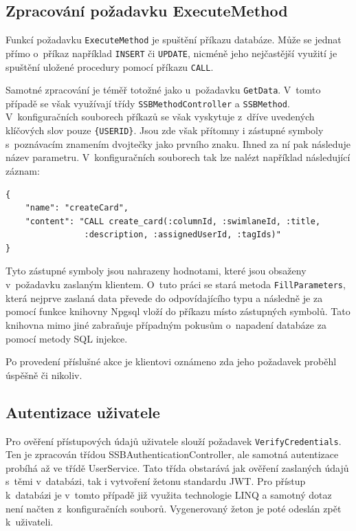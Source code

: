 \subsection{Zpracování požadavku ExecuteMethod}
Funkcí požadavku \texttt{ExecuteMethod} je spuštění příkazu databáze. Může se jednat přímo o~příkaz například \texttt{INSERT} či \texttt{UPDATE}, nicméně jeho nejčastější využití je spuštění uložené procedury pomocí příkazu \texttt{CALL}.

Samotné zpracování je téměř totožné jako u~požadavku \texttt{GetData}. V~tomto případě se však využívají třídy \texttt{SSBMethodController} a \texttt{SSBMethod}. V~konfiguračních souborech příkazů se však vyskytuje z~dříve uvedených klíčových slov pouze \texttt{\{USERID\}}. Jsou zde však přítomny i zástupné symboly s~poznávacím znamením dvojtečky jako prvního znaku. Ihned za ní pak následuje název parametru. V~konfiguračních souborech tak lze nalézt například následující záznam:

\begin{verbatim}
{
    "name": "createCard",
    "content": "CALL create_card(:columnId, :swimlaneId, :title,
                :description, :assignedUserId, :tagIds)"
}
\end{verbatim}

Tyto zástupné symboly jsou nahrazeny hodnotami, které jsou obsaženy v~požadavku zaslaným klientem. O~tuto práci se stará metoda \texttt{FillParameters}, která nejprve zaslaná data převede do odpovídajícího typu a následně je za pomocí funkce knihovny Npgsql vloží do příkazu místo zástupných symbolů. Tato knihovna mimo jiné zabraňuje případným pokusům o~napadení databáze za pomocí metody SQL injekce. 

Po provedení příslušné akce je klientovi oznámeno zda jeho požadavek proběhl úspěšně či nikoliv.

\subsection{Autentizace uživatele}
Pro ověření přístupových údajů uživatele slouží požadavek \texttt{VerifyCredentials}. Ten je zpracován třídou SSBAuthenticationController, ale samotná autentizace probíhá až ve třídě UserService. Tato třída obstarává jak ověření zaslaných údajů s~těmi v~databázi, tak i vytvoření žetonu standardu JWT. Pro přístup k~databázi je v~tomto případě již využita technologie LINQ a samotný dotaz není načten z~konfiguračních souborů. Vygenerovaný žeton je poté odeslán zpět k~uživateli.



